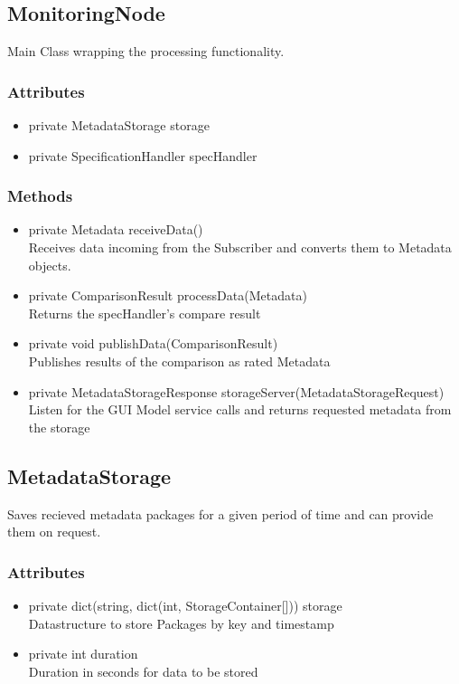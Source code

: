 
\subsection{MonitoringNode}
Main Class wrapping the processing functionality.

\subsubsection{Attributes}
\begin{itemize}
	\item private  MetadataStorage storage
	\item private  SpecificationHandler specHandler
\end{itemize}
\subsubsection{Methods}
\begin{itemize}
	\item private  Metadata receiveData()\\
	Receives data incoming from the Subscriber and converts them to Metadata objects.
	\item private  ComparisonResult processData(Metadata)\\
	Returns the specHandler's compare result
	\item private  void publishData(ComparisonResult)\\
	Publishes results of the comparison as rated Metadata
	\item private  MetadataStorageResponse storageServer(MetadataStorageRequest)\\
	Listen for the GUI Model service calls and returns requested metadata from the storage
\end{itemize}


\subsection{MetadataStorage}
Saves recieved metadata packages for a given period of time and can provide them on request.

\subsubsection{Attributes}
\begin{itemize}
	\item private  dict(string, dict(int, StorageContainer[])) storage\\
	Datastructure to store Packages by key and timestamp
	\item private  int duration\\
	Duration in seconds for data to be stored
\end{itemize}
